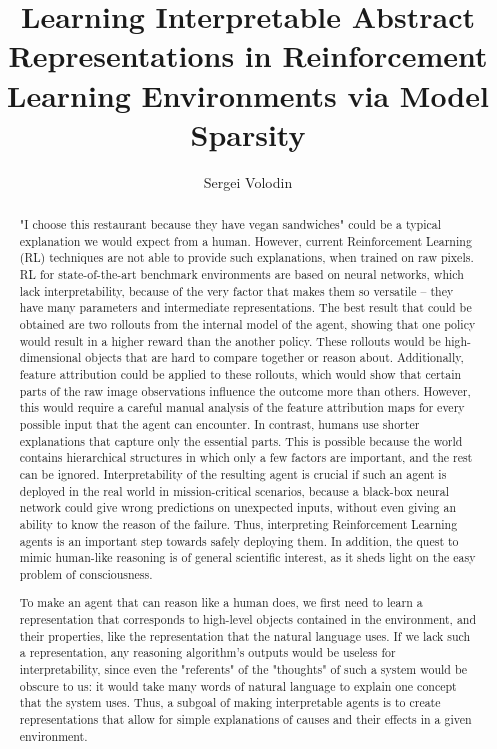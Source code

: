 \documentclass[a4paper,11pt,oneside]{report}
\title{Learning Interpretable Abstract Representations in Reinforcement Learning Environments via Model Sparsity}
\author{Sergei Volodin}
\begin{document}
    \maketitle
    \makededication
    \makeacks

\begin{abstract}
"I choose this restaurant because they have vegan sandwiches" could be a typical explanation we would expect from a human. However, current Reinforcement Learning (RL) techniques are not able to provide such explanations, when trained on raw pixels.
RL for state-of-the-art benchmark environments are based on neural networks, which lack interpretability, because of the very factor that makes them so versatile -- they have many parameters and intermediate representations.
The best result that could be obtained are two rollouts from the internal model of the agent, showing that one policy would result in a higher reward than the another policy. These rollouts would be high-dimensional objects that are hard to compare together or reason about.
Additionally, feature attribution could be applied to these rollouts, which would show that certain parts of the raw image observations influence the outcome more than others. However, this would require a careful manual analysis of the feature attribution maps for every possible input that the agent can encounter.
In contrast, humans use shorter explanations that capture only the essential parts. This is possible because the world contains hierarchical structures in which only a few factors are important, and the rest can be ignored.
Interpretability of the resulting agent is crucial if such an agent is deployed in the real world in mission-critical scenarios, because a black-box neural network could give wrong predictions on unexpected inputs, without even giving an ability to know the reason of the failure. Thus, interpreting Reinforcement Learning agents is an important step towards safely deploying them.
In addition, the quest to mimic human-like reasoning is of general scientific interest, as it sheds light on the easy problem of consciousness.

To make an agent that can reason like a human does, we first need to learn a representation that corresponds to high-level objects contained in the environment, and their properties, like the representation that the natural language uses. If we lack such a representation, any reasoning algorithm's outputs would be useless for interpretability, since even the "referents" of the "thoughts" of such a system would be obscure to us: it would take many words of natural language to explain one concept that the system uses. Thus, a subgoal of making interpretable agents is to create representations that allow for simple explanations of causes and their effects in a given environment.


\end{abstract}
\end{document}
